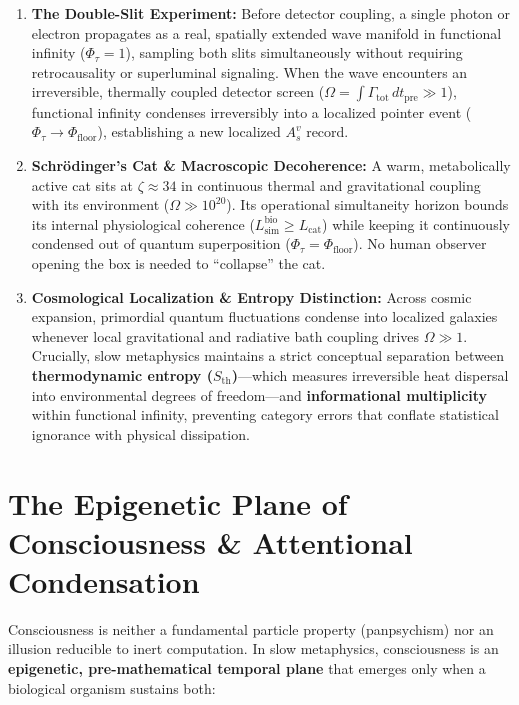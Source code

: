 \documentclass[11pt,a4paper]{article}
\begin{document}
\begin{enumerate}
    \item \textbf{The Double-Slit Experiment:} Before detector coupling, a single photon or electron propagates as a real, spatially extended wave manifold in functional infinity ($\Phi_\tau = 1$), sampling both slits simultaneously without requiring retrocausality or superluminal signaling. When the wave encounters an irreversible, thermally coupled detector screen ($\Omega = \int \Gamma_{\mathrm{tot}}\,dt_{\mathrm{pre}} \gg 1$), functional infinity condenses irreversibly into a localized pointer event ($\Phi_\tau \to \Phi_{\mathrm{floor}}$), establishing a new localized $A_s^v$ record.
    \item \textbf{Schr\"odinger's Cat \& Macroscopic Decoherence:} A warm, metabolically active cat sits at $\zeta \approx 34$ in continuous thermal and gravitational coupling with its environment ($\Omega \gg 10^{20}$). Its operational simultaneity horizon bounds its internal physiological coherence ($L_{\mathrm{sim}}^{\mathrm{bio}} \ge L_{\mathrm{cat}}$) while keeping it continuously condensed out of quantum superposition ($\Phi_\tau = \Phi_{\mathrm{floor}}$). No human observer opening the box is needed to ``collapse'' the cat.
    \item \textbf{Cosmological Localization \& Entropy Distinction:} Across cosmic expansion, primordial quantum fluctuations condense into localized galaxies whenever local gravitational and radiative bath coupling drives $\Omega \gg 1$. Crucially, slow metaphysics maintains a strict conceptual separation between \textbf{thermodynamic entropy ($S_{\mathrm{th}}$)}---which measures irreversible heat dispersal into environmental degrees of freedom---and \textbf{informational multiplicity} within functional infinity, preventing category errors that conflate statistical ignorance with physical dissipation.
\end{enumerate}

\section{The Epigenetic Plane of Consciousness \& Attentional Condensation}

Consciousness is neither a fundamental particle property (panpsychism) nor an illusion reducible to inert computation. In slow metaphysics, consciousness is an \textbf{epigenetic, pre-mathematical temporal plane} that emerges only when a biological organism sustains both:
\end{document}
